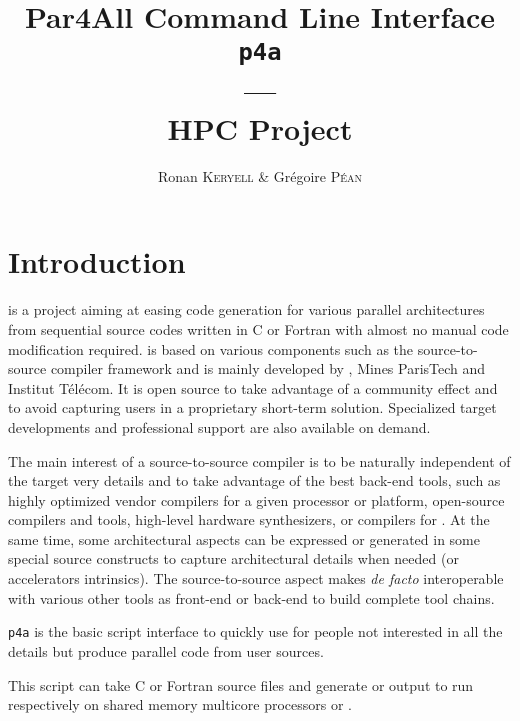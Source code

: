 \documentclass[a4paper]{article}
\begin{document}
\title{Par4All Command Line Interface\\
  \texttt{p4a}\\
  ---\\
  HPC Project}

\author{Ronan \textsc{Keryell} \& Grégoire \textsc{Péan}}

\maketitle

\tableofcontents{}


\section{Introduction}
\label{sec:introduction}

\Apfa is a project aiming at easing code generation for various parallel
architectures from sequential source codes written in C or Fortran with
almost no manual code modification required. \Apfa is based on various
components such as the \Apips source-to-source compiler framework and is
mainly developed by \Ahpcp, Mines ParisTech and Institut Télécom. It
is open source to take advantage of a community effect and to avoid
capturing users in a proprietary short-term solution. Specialized target
developments and professional support are also available on demand.

The main interest of a source-to-source compiler is to be naturally
independent of the target very details and to take advantage of the best
back-end tools, such as highly optimized vendor compilers for a given
processor or platform, open-source compilers and tools, high-level
hardware synthesizers, \Acuda or \Aopencl compilers for \Agpu. At the same
time, some architectural aspects can be expressed or generated in some
special source constructs to capture architectural details when needed
(\Asimd or accelerators intrinsics). The source-to-source aspect makes
\Apfa \emph{de facto} interoperable with various other tools as front-end
or back-end to build complete tool chains.

\texttt{p4a} is the basic script interface to quickly use \Apfa for people
not interested in all the \Apips details but produce parallel code from
user sources.

This script can take C or Fortran source files and generate \Aopenmp or
\Acuda output to run respectively on shared memory multicore processors or
\Agpu.
\end{document}
